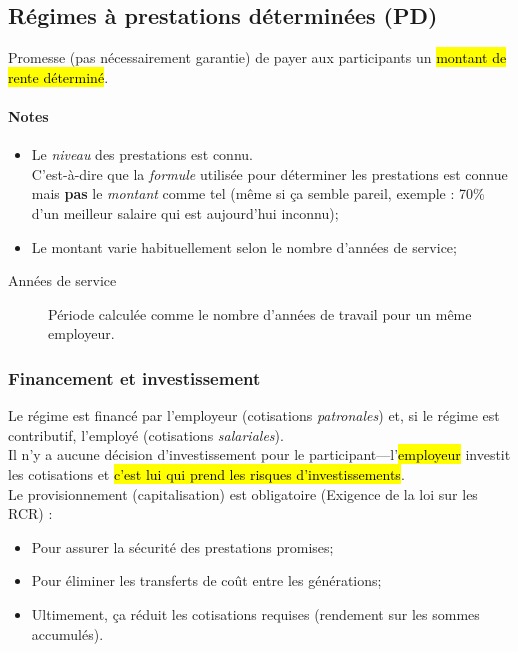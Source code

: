 \documentclass[10pt, french]{article}
\begin{document}
\begin{multicols*}{3}
\columnbreak

\subsection*{Régimes à prestations déterminées (PD)}

\begin{definitionNOHFILL}[Description]
Promesse (pas nécessairement garantie) de payer aux participants un \hl{montant de rente déterminé}.

\paragraph{Notes}
\begin{itemize}[leftmargin = *]
	\item	Le \textit{niveau} des prestations est connu.\\
			C'est-à-dire que la \textit{formule} utilisée pour déterminer les prestations est connue mais \textbf{pas} le \textit{montant} comme tel (même si ça semble pareil, exemple : 70\% d'un meilleur salaire qui est aujourd'hui inconnu);
	\item	Le montant varie habituellement selon le nombre d'années de service;
\end{itemize}
\begin{description}
	\item[Années de service]	Période calculée comme le nombre d'années de travail pour un même employeur.
\end{description}
\end{definitionNOHFILL}

\subsubsection*{Financement et investissement}

Le régime est financé par l'employeur (cotisations \textit{patronales}) et, si le régime est contributif, l'employé (cotisations \textit{salariales}).\\

Il n'y a aucune décision d'investissement pour le participant---l'\hl{employeur} investit les cotisations et \hl{c'est lui qui prend les risques d'investissements}. \\

Le provisionnement (capitalisation) est obligatoire (Exigence de la loi sur les RCR) : 
\begin{itemize}
\item Pour assurer la sécurité des prestations promises;
\item Pour éliminer les transferts de coût entre les générations;
\item Ultimement, ça réduit les cotisations requises (rendement sur les sommes accumulés).
\end{itemize}


\end{multicols*}
\end{document}
